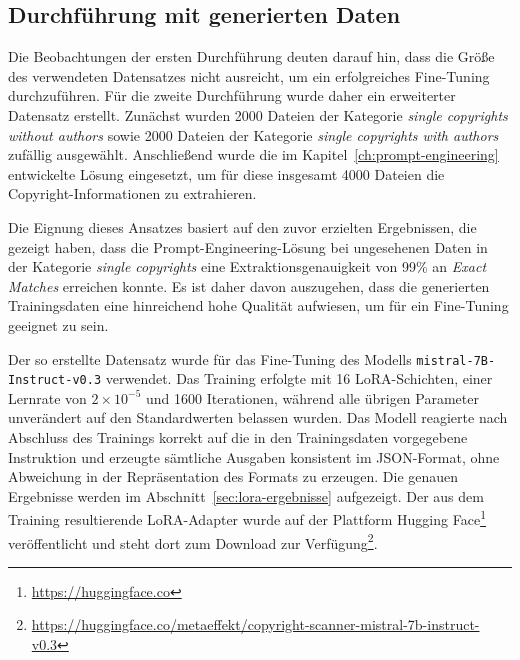 \subsection{Durchführung mit generierten Daten}

Die Beobachtungen der ersten Durchführung deuten darauf hin, dass die Größe des verwendeten Datensatzes nicht ausreicht, um ein erfolgreiches Fine-Tuning durchzuführen.
Für die zweite Durchführung wurde daher ein erweiterter Datensatz erstellt.
Zunächst wurden 2000 Dateien der Kategorie \textit{single copyrights without authors} sowie 2000 Dateien der Kategorie \textit{single copyrights with authors} zufällig ausgewählt.
Anschließend wurde die im Kapitel~\ref{ch:prompt-engineering} entwickelte Lösung eingesetzt, um für diese insgesamt 4000 Dateien die Copyright-Informationen zu extrahieren.

Die Eignung dieses Ansatzes basiert auf den zuvor erzielten Ergebnissen, die gezeigt haben, dass die Prompt-Engineering-Lösung bei ungesehenen Daten in der Kategorie \textit{single copyrights} eine Extraktionsgenauigkeit von \num{99}\% an \textit{Exact Matches} erreichen konnte.
Es ist daher davon auszugehen, dass die generierten Trainingsdaten eine hinreichend hohe Qualität aufwiesen, um für ein Fine-Tuning geeignet zu sein.

Der so erstellte Datensatz wurde für das Fine-Tuning des Modells \texttt{mistral-7B-Instruct-v0.3} verwendet.
Das Training erfolgte mit 16 LoRA-Schichten, einer Lernrate von $2 \times 10^{-5}$ und \num{1600} Iterationen, während alle übrigen Parameter unverändert auf den Standardwerten belassen wurden.
Das Modell reagierte nach Abschluss des Trainings korrekt auf die in den Trainingsdaten vorgegebene Instruktion und erzeugte sämtliche Ausgaben konsistent im JSON-Format, ohne Abweichung in der Repräsentation des Formats zu erzeugen.
Die genauen Ergebnisse werden im Abschnitt~\ref{sec:lora-ergebnisse} aufgezeigt.
Der aus dem Training resultierende LoRA-Adapter wurde auf der Plattform Hugging Face\footnote{\url{https://huggingface.co}} veröffentlicht und steht dort zum Download zur Verfügung\footnote{\url{https://huggingface.co/metaeffekt/copyright-scanner-mistral-7b-instruct-v0.3}}.

